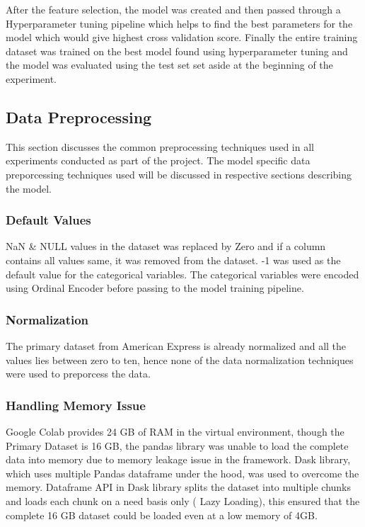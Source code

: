 \documentclass[twoside,11pt,a4paper]{article}
\begin{document}
After the feature selection, the model was created and then passed through a Hyperparameter tuning pipeline which helps to find the best parameters for the model which would give highest cross validation score. Finally the entire training dataset was trained on the best model found using hyperparameter tuning and the model was evaluated using the test set set aside at the beginning of the experiment.

\subsection{Data Preprocessing} 
This section discusses the common preprocessing techniques used in all experiments conducted as part of the project. The model specific data preporcessing techniques used will be discussed in respective sections describing the model.

\subsubsection{Default Values}
NaN \& NULL values in the dataset was replaced by Zero and if a column contains all values same, it was removed from the dataset. -1 was used as the default value for the categorical variables. The categorical variables were encoded using Ordinal Encoder before passing to the model training pipeline.

\subsubsection{Normalization}
The primary dataset from American Express is already normalized and all the values lies between zero to ten, hence none of the data normalization techniques were used to preporcess the data.
\subsubsection{Handling Memory Issue}
Google Colab provides 24 GB of \acf{RAM} in the  virtual environment, though the Primary Dataset is 16 GB,  the pandas library was unable to load the complete data into memory due to memory leakage issue in the framework. Dask library, which uses multiple Pandas dataframe under the hood, was used to overcome the memory. Dataframe API in Dask library splits the dataset into multiple chunks and loads each chunk on a need basis only ( Lazy Loading), this ensured that the complete 16 GB dataset could be loaded even at a low memory of 4GB.
\end{document}
